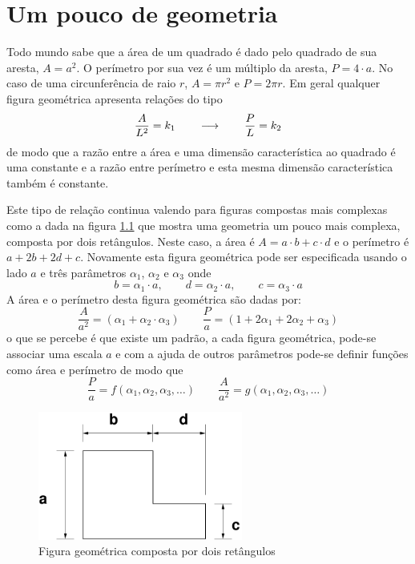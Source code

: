 
\chapter{Um pouco de geometria}

Todo mundo sabe que a área de um quadrado é dado pelo quadrado de sua aresta, $A=a^2$. O perímetro por sua vez é um múltiplo da aresta, $P = 4\cdot a$. No caso de uma circunferência de raio $r$, $A = \pi r^2$ e $P = 2\pi r$. Em geral qualquer figura geométrica apresenta relações do tipo 
\[
\frac{A}{L^2} = k_1 \qquad\longrightarrow\qquad \frac{P}{L} = k_2
\]
de modo que a razão entre a área e uma dimensão característica ao quadrado é uma constante e a razão entre perímetro e esta mesma dimensão característica também é constante. 

Este tipo de relação continua valendo para figuras compostas mais complexas como a dada na figura \ref{fig:L2d} que mostra uma geometria um pouco mais complexa, composta por dois retângulos. Neste caso, a área é $A = a\cdot b + c\cdot d$ e o perímetro é $a + 2b + 2d + c$. Novamente esta figura geométrica pode ser especificada usando o lado $a$ e três parâmetros $\alpha_1$, $\alpha_2$ e $\alpha_3$ onde
\[
b = \alpha_1\cdot a, \qquad d = \alpha_2\cdot a, \qquad c = \alpha_3\cdot a
\]
A área e o perímetro desta figura geométrica são dadas por:
\[
\frac{A}{a^2} = (\alpha_1 + \alpha_2\cdot\alpha_3) \qquad \frac{P}{a} = (1 + 2\alpha_1+2\alpha_2+\alpha_3)
\]
o que se percebe é que existe um padrão, a cada figura geométrica, pode-se associar uma escala $a$ e com a ajuda de outros parâmetros pode-se definir funções como área e perímetro de modo que 
\[
\frac{P}{a} = f(\alpha_1, \alpha_2, \alpha_3, \ldots) \qquad \frac{A}{a^2} = g(\alpha_1, \alpha_2, \alpha_3, \ldots)
\]

\begin{figure}
\centering
\includegraphics[width=0.6\textwidth]{./figuras/L2d.pdf}
\caption{Figura geométrica composta por dois retângulos}
\label{fig:L2d}
\end{figure}

